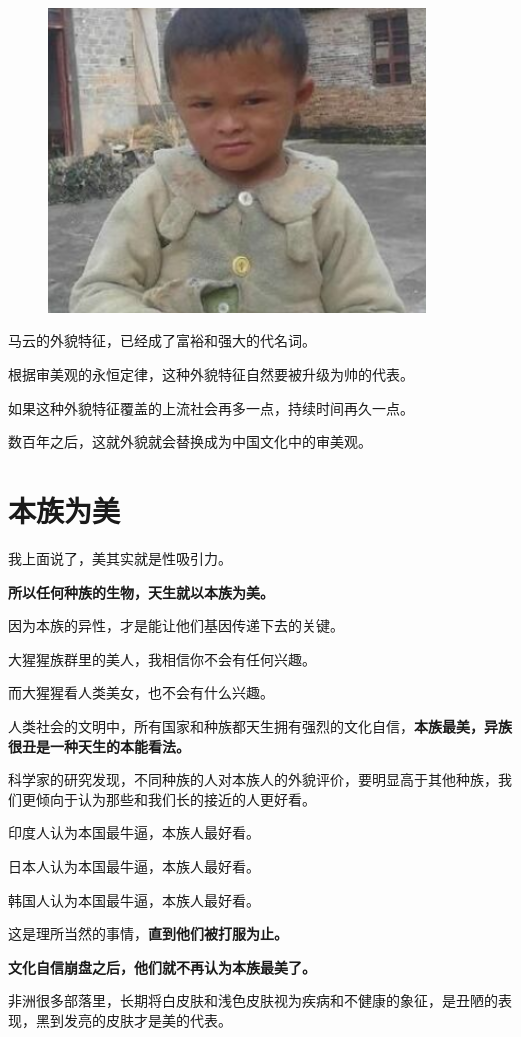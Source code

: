 \documentclass[UTF8, 11pt, oneside]{ctexart}
\newcommand{\zd}[1]{\textbf{\textcolor[RGB]{123,12,0}{#1}}} %
\newcommand{\biaoti}[1]{%
    \section*{#1}
}
\begin{document}
\begin{figure}[H]
    \centering
    \includegraphics[width=10cm]{2023-09-06-002}
\end{figure}

马云的外貌特征，已经成了富裕和强大的代名词。

根据审美观的永恒定律，这种外貌特征自然要被升级为帅的代表。

如果这种外貌特征覆盖的上流社会再多一点，持续时间再久一点。

数百年之后，这就外貌就会替换成为中国文化中的审美观。

\biaoti{本族为美}

我上面说了，美其实就是性吸引力。

\zd{所以任何种族的生物，天生就以本族为美。}

因为本族的异性，才是能让他们基因传递下去的关键。

大猩猩族群里的美人，我相信你不会有任何兴趣。

而大猩猩看人类美女，也不会有什么兴趣。

人类社会的文明中，所有国家和种族都天生拥有强烈的文化自信，\zd{本族最美，异族很丑是一种天生的本能看法。}

科学家的研究发现，不同种族的人对本族人的外貌评价，要明显高于其他种族，我们更倾向于认为那些和我们长的接近的人更好看。

印度人认为本国最牛逼，本族人最好看。

日本人认为本国最牛逼，本族人最好看。

韩国人认为本国最牛逼，本族人最好看。

这是理所当然的事情，\zd{直到他们被打服为止。}

\zd{文化自信崩盘之后，他们就不再认为本族最美了。}

非洲很多部落里，长期将白皮肤和浅色皮肤视为疾病和不健康的象征，是丑陋的表现，黑到发亮的皮肤才是美的代表。
\end{document}
